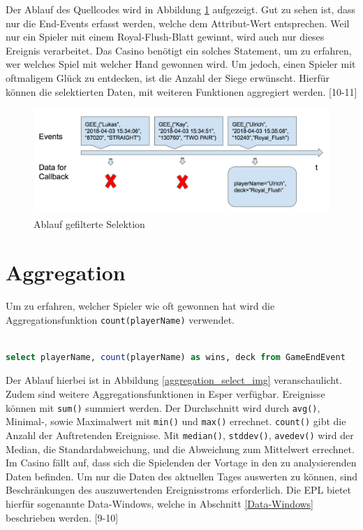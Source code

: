 Der Ablauf des Quellcodes wird in Abbildung \ref{filter_select_img} aufgezeigt. Gut zu sehen ist, dass nur die End-Events erfasst werden, welche dem Attribut-Wert entsprechen. Weil nur ein Spieler mit einem Royal-Flush-Blatt gewinnt, wird auch nur dieses Ereignis verarbeitet.
Das Casino benötigt ein solches Statement, um zu erfahren, wer welches Spiel mit welcher Hand gewonnen wird. Um jedoch, einen Spieler mit oftmaligem Glück zu entdecken, ist die Anzahl der Siege erwünscht. Hierfür können die selektierten Daten, mit weiteren Funktionen aggregiert werden.
\cite{EsperRef2018}[10-11]

\begin{figure}[ht]
	\centering
	\includegraphics[width=\textwidth,height=\textheight, keepaspectratio]{images/statement_basic_filter.png}
	\caption{Ablauf gefilterte Selektion}
	\label{filter_select_img}
\end{figure}

\section{Aggregation}

Um zu erfahren, welcher Spieler wie oft gewonnen hat wird die Aggregationsfunktion \texttt{count(playerName)} verwendet.
\begin{lstlisting}[caption={Statement mit Aggregation},label=aggregation_select,captionpos=b,language=SQL]

select playerName, count(playerName) as wins, deck from GameEndEvent

\end{lstlisting}
Der Ablauf hierbei ist in Abbildung \ref{aggregation_select_img} veranschaulicht. 
Zudem sind weitere Aggregationsfunktionen in Esper verfügbar.
Ereignisse können mit \texttt{sum()} summiert werden. Der Durchschnitt wird durch \texttt{avg()}, Minimal-, sowie Maximalwert mit \texttt{min()} und \texttt{max()} errechnet. \texttt{count()} gibt die Anzahl der Auftretenden Ereignisse. Mit \texttt{median()}, \texttt{stddev()}, \texttt{avedev()} wird der Median, die Standardabweichung, und die Abweichung zum Mittelwert errechnet.
Im Casino fällt auf, dass sich die Spielenden der Vortage in den zu analysierenden Daten befinden. Um nur die Daten des aktuellen Tages auswerten zu können, sind Beschränkungen des auszuwertenden Ereignisstroms erforderlich. Die \acf{EPL} bietet hierfür sogenannte Data-Windows, welche in Abschnitt \ref{Data-Windows} beschrieben werden.
\cite{EsperRef2018}[9-10]

